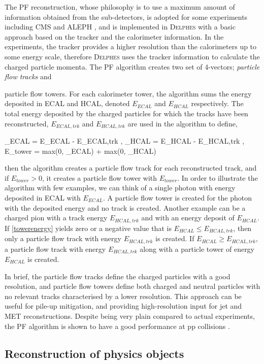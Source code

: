 The PF reconstruction, whose philosophy is to use a maximum amount of information obtained from the sub-detectors, is adopted for some experiments including CMS \cite{CMS-PAS-PFT-09-001} and ALEPH \cite{ALEPH:1994ayc}, and is implemented in \textsc{Delphes} with a basic approach based on the tracker and the calorimeter information. In the experiments, the tracker provides a higher resolution than the calorimeters up to some energy scale, therefore \textsc{Delphes} uses the tracker information to calculate the charged particle momenta. The PF algorithm creates two set of 4-vectors; \emph{particle flow tracks} and {particle flow towers. For each calorimeter tower, the algorithm sums the energy deposited in ECAL and HCAL, denoted $E_{ECAL}$ and $E_{HCAL}$ respectively. The total energy deposited by the charged particles for which the tracks have been reconstructed, $E_{ECAL,trk}$ and $E_{HCAL,trk}$ are used in the algorithm to define,

\be
\Delta_{ECAL} = E_{ECAL} - E_{ECAL,trk} \; , \; \Delta_{HCAL} = E_{HCAL} - E_{HCAL,trk} \; ,
\ee
\be
E_{tower} = max(0, \Delta_{ECAL}) + max(0, \Delta_{HCAL})
\label{towerenergy}
\ee

then the algorithm creates a particle flow track for each reconstructed track, and if $E_{tower} > 0$, it creates a particle flow tower with $E_{tower}$. In order to illustrate the algorithm with few examples, we can think of a single photon with energy deposited in ECAL with $E_{ECAL}$. A particle flow tower is created for the photon with the deposited energy and no track is created. Another example can be a charged pion with a track energy $E_{HCAL,trk}$ and with an energy deposit of $E_{HCAL}$. If \autoref{towerenergy} yields zero or a negative value that is $E_{HCAL}\leq E_{HCAL,trk}$, then only a particle flow track with energy $E_{HCAL,trk}$ is created. If $E_{HCAL}\geq E_{HCAL,trk}$, a particle flow track with energy $E_{HCAL,trk}$ along with a particle tower of energy $E_{HCAL}$ is created.

In brief, the particle flow tracks define the charged particles with a good resolution, and particle flow towers define both charged and neutral particles with no relevant tracks characterised by a lower resolution. This approach can be useful for pile-up mitigation, and providing high-resolution input for jet and MET reconstructions. Despite being very plain compared to actual experiments, the PF algorithm is shown to have a good performance at pp collisions \cite{deFavereau2014}. 

\subsection{Reconstruction of physics objects}\label{reconstruction}

}
